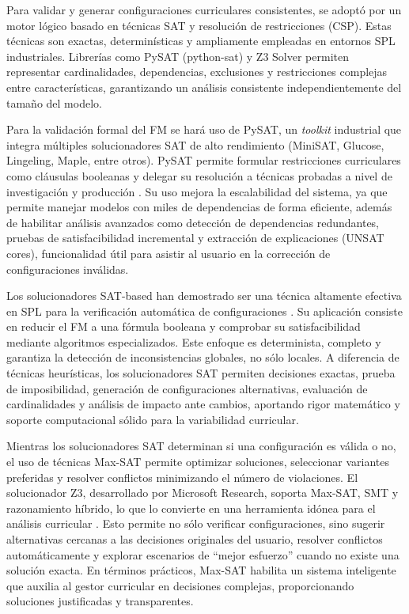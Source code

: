 Para validar y generar configuraciones curriculares consistentes, 
se adoptó por un motor lógico basado en técnicas \ac{SAT} y resolución de restricciones (CSP). Estas técnicas son exactas, 
determinísticas y ampliamente empleadas en entornos \ac{SPL} industriales. 
Librerías como PySAT (python-sat) y Z3 Solver permiten representar 
cardinalidades, dependencias, exclusiones y restricciones complejas entre 
características, garantizando un análisis consistente independientemente del 
tamaño del modelo.

Para la validación formal del \ac{FM} se hará uso de
PySAT, un \textit{toolkit} industrial que integra múltiples solucionadores 
\ac{SAT} de alto rendimiento (MiniSAT, Glucose, Lingeling, Maple, entre otros).
PySAT permite formular restricciones curriculares como cláusulas booleanas 
y delegar su resolución a técnicas probadas a nivel de investigación y 
producción \citep{pysat2018}. Su uso mejora la escalabilidad del sistema, 
ya que permite manejar modelos con miles de dependencias de forma 
eficiente, además de habilitar análisis avanzados como detección de 
dependencias redundantes, pruebas de satisfacibilidad incremental y 
extracción de explicaciones (UNSAT cores), funcionalidad útil para 
asistir al usuario en la corrección de configuraciones inválidas.

Los solucionadores \ac{SAT}-based han demostrado ser una técnica 
altamente efectiva en \ac{SPL} para la 
verificación automática de configuraciones \citep{benavides2010automated}. Su 
aplicación consiste en reducir el \ac{FM} a una 
fórmula booleana y comprobar su satisfacibilidad mediante algoritmos 
especializados. Este enfoque es determinista, completo y garantiza la 
detección de inconsistencias globales, no sólo locales. A diferencia de 
técnicas heurísticas, los solucionadores \ac{SAT} permiten decisiones exactas, 
prueba de imposibilidad, generación de configuraciones alternativas, 
evaluación de cardinalidades y análisis de impacto ante cambios, 
aportando rigor matemático y soporte computacional sólido para la 
variabilidad curricular.

Mientras los solucionadores \ac{SAT} determinan si una configuración es 
válida o no, el uso de técnicas Max-\ac{SAT} permite optimizar 
soluciones, seleccionar variantes preferidas y resolver conflictos 
minimizando el número de violaciones. El solucionador Z3, desarrollado 
por Microsoft Research, soporta Max-SAT, \ac{SMT} y razonamiento híbrido, lo que lo 
convierte en una herramienta idónea para el análisis curricular 
\citep{z3_2008}. Esto permite no sólo verificar configuraciones, 
sino sugerir alternativas cercanas a las decisiones originales del 
usuario, resolver conflictos automáticamente y explorar escenarios de 
“mejor esfuerzo” cuando no existe una solución exacta. En términos 
prácticos, Max-\ac{SAT} habilita un sistema inteligente que auxilia al 
gestor curricular en decisiones complejas, proporcionando soluciones 
justificadas y transparentes.

